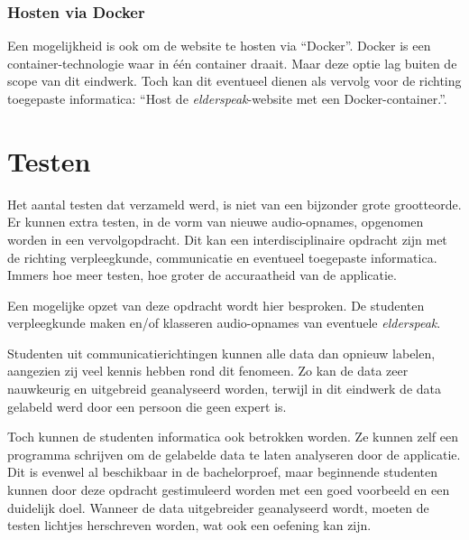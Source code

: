 \subsubsection{Hosten via Docker}
Een mogelijkheid is ook om de website te hosten via ``Docker''. Docker is een container-technologie waar in één container draait. Maar deze optie lag buiten de scope van dit eindwerk. Toch kan dit eventueel dienen als vervolg voor de richting toegepaste informatica: ``Host de \textit{elderspeak}-website met een Docker-container.''.

\section{Testen}
Het aantal testen dat verzameld werd, is niet van een bijzonder grote grootteorde. Er kunnen extra testen, in de vorm van nieuwe audio-opnames, opgenomen worden in een vervolgopdracht. Dit kan een interdisciplinaire opdracht zijn met de richting verpleegkunde, communicatie en eventueel toegepaste informatica. Immers hoe meer testen, hoe groter de accuraatheid van de applicatie.

Een mogelijke opzet van deze opdracht wordt hier besproken. De studenten verpleegkunde maken en/of klasseren audio-opnames van eventuele \textit{elderspeak}.

Studenten uit communicatierichtingen kunnen alle data dan opnieuw labelen, aangezien zij veel kennis hebben rond dit fenomeen. Zo kan de data zeer nauwkeurig en uitgebreid geanalyseerd worden, terwijl in dit eindwerk de data gelabeld werd door een persoon die geen expert is.

Toch kunnen de studenten informatica ook betrokken worden. Ze kunnen zelf een programma schrijven om de gelabelde data te laten analyseren door de applicatie. Dit is evenwel al beschikbaar in de bachelorproef, maar beginnende studenten kunnen door deze opdracht gestimuleerd worden met een goed voorbeeld en een duidelijk doel. Wanneer de data uitgebreider geanalyseerd wordt, moeten de testen lichtjes herschreven worden, wat ook een oefening kan zijn.
